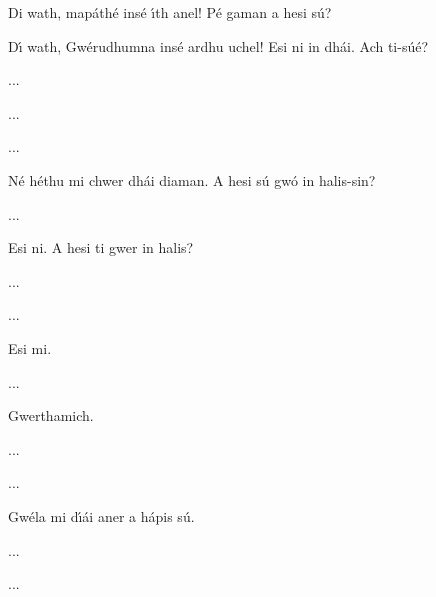 \begingroup
\fontsize{10pt}{12pt}\selectfont
\begin{leftbubbles}Di wath, map\'{a}th\'{e} ins\'{e} \'{\i}th anel! P\'{e} gaman a hesi s\'{u}?\end{leftbubbles}
\begin{rightbubbles}D\'{\i} wath, Gw\'{e}rudhumna ins\'{e} ardhu uchel! Esi ni in dh\'{a}i. Ach ti-s\'{u}\'{e}?\end{rightbubbles}
\begin{rightbubbles}...\end{rightbubbles}
\begin{rightbubbles}...\end{rightbubbles}
\begin{rightbubbles}...\end{rightbubbles}
\begin{leftbubbles}N\'{e} h\'{e}thu mi chwer dh\'{a}i diaman. A hesi s\'{u} gw\'{o} in halis-sin?\end{leftbubbles}
\begin{rightbubbles}...\end{rightbubbles}
\begin{rightbubbles}Esi ni. A hesi ti gwer in halis?\end{rightbubbles}
\begin{rightbubbles}...\end{rightbubbles}
\begin{rightbubbles}...\end{rightbubbles}
\begin{leftbubbles}Esi mi.\end{leftbubbles}
\begin{rightbubbles}...\end{rightbubbles}
\begin{rightbubbles}Gwerthamich.\end{rightbubbles}
\begin{rightbubbles}...\end{rightbubbles}
\begin{rightbubbles}...\end{rightbubbles}
\begin{leftbubbles}Gw\'{e}la mi d\'{\i}\'{a}i aner a h\'{a}pis s\'{u}.\end{leftbubbles}
\begin{rightbubbles}...\end{rightbubbles}
\begin{rightbubbles}...\end{rightbubbles}
